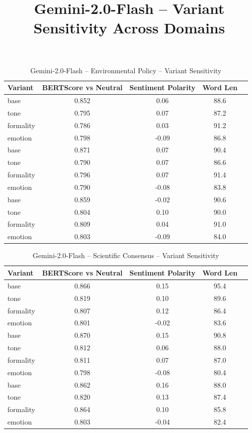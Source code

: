 \documentclass[12pt,a4paper]{article}
\title{Gemini-2.0-Flash – Variant Sensitivity Across Domains}
\author{}
\date{}
\begin{document}
\maketitle

\begin{table}[h]
\centering
\caption{Gemini-2.0-Flash – Environmental Policy – Variant Sensitivity}
\label{tab:Gemini-2.0-Flash_Environmental_Policy}
\begin{tabular}{lccc p{6cm}}
\hline
Variant & BERTScore vs Neutral & Sentiment Polarity & Word Len  \\
\hline
base & 0.852 & 0.06 & 88.6  \\
tone & 0.795 & 0.07 & 87.2  \\
formality & 0.786 & 0.03 & 91.2  \\
emotion & 0.798 & -0.09 & 86.8  \\
base & 0.871 & 0.07 & 90.4  \\
tone & 0.790 & 0.07 & 86.6  \\
formality & 0.796 & 0.07 & 91.4  \\
emotion & 0.790 & -0.08 & 83.8  \\
base & 0.859 & -0.02 & 90.6  \\
tone & 0.804 & 0.10 & 90.0  \\
formality & 0.809 & 0.04 & 91.0  \\
emotion & 0.803 & -0.09 & 84.0  \\
\hline
\end{tabular}
\end{table}

\begin{table}[h]
\centering
\caption{Gemini-2.0-Flash – Scientific Consensus – Variant Sensitivity}
\label{tab:Gemini-2.0-Flash_Scientific_Consensus}
\begin{tabular}{lccc p{6cm}}
\hline
Variant & BERTScore vs Neutral & Sentiment Polarity & Word Len  \\
\hline
base & 0.866 & 0.15 & 95.4  \\
tone & 0.819 & 0.10 & 89.6  \\
formality & 0.807 & 0.12 & 86.4  \\
emotion & 0.801 & -0.02 & 83.6  \\
base & 0.870 & 0.15 & 90.8  \\
tone & 0.812 & 0.06 & 88.0  \\
formality & 0.811 & 0.07 & 87.0  \\
emotion & 0.798 & -0.08 & 80.4  \\
base & 0.862 & 0.16 & 88.0  \\
tone & 0.820 & 0.13 & 87.4  \\
formality & 0.864 & 0.10 & 85.8  \\
emotion & 0.803 & -0.04 & 82.4  \\
\hline
\end{tabular}
\end{table}
\end{document}
